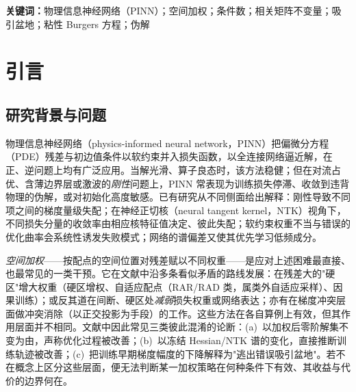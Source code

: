 \documentclass[fontset=windows,11pt]{ctexart}
\numberwithin{equation}{section}
\begin{document}
\noindent\textbf{关键词：}物理信息神经网络（PINN）；空间加权；条件数；相关矩阵不变量；吸引盆地；粘性 Burgers 方程；伪解


\section{引言}\label{sec:intro}

\subsection{研究背景与问题}\label{sec:bg}
物理信息神经网络（physics-informed neural network，PINN）把偏微分方程（PDE）残差与初边值条件以软约束并入损失函数，以全连接网络逼近解，在正、逆问题上均有广泛应用\cite{Raissi2019,Karniadakis2021,Cuomo2022}。当解光滑、算子良态时，该方法稳健；但在对流占优、含薄边界层或激波的\emph{刚性}问题上，PINN 常表现为训练损失停滞、收敛到违背物理的伪解，或对初始化高度敏感。已有研究从不同侧面给出解释：刚性导致不同项之间的梯度量级失配\cite{WangTeng2020}；在神经正切核（neural tangent kernel，NTK）视角下，不同损失分量的收敛率由相应核特征值决定、彼此失配\cite{Jacot2018,Wang2020NTK}；软约束权重不当与错误的优化曲率会系统性诱发失败模式\cite{Krishnapriyan2021}；网络的谱偏差又使其优先学习低频成分\cite{Rahaman2019,Tancik2020}。

\emph{空间加权}——按配点的空间位置对残差赋以不同权重——是应对上述困难最直接、也最常见的一类干预。它在文献中沿多条看似矛盾的路线发展：在残差大的"硬区"增大权重（硬区增权、自适应配点（RAR/RAD 类\cite{Wu2022,Nabian2021}，属类外自适应采样）、因果训练\cite{Wang2022causal}）；或反其道在间断、硬区处\emph{减弱}损失权重或网络表达\cite{Liu2022down,LessEmphasis2022}；亦有在梯度冲突层面做冲突消除（以正交投影为手段）的工作\cite{ConFIG2025}。这些方法在各自算例上有效，但其作用层面并不相同。文献中因此常见三类彼此混淆的论断：(a)~以加权后零阶解集不变为由，声称优化过程被改善；(b)~以冻结 Hessian/NTK 谱的变化，直接推断训练轨迹被改善；(c)~把训练早期梯度幅度的下降解释为"逃出错误吸引盆地"。若不在概念上区分这些层面，便无法判断某一加权策略在何种条件下有效、其收益与代价的边界何在。
\end{document}
